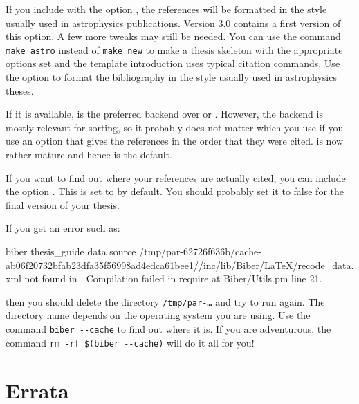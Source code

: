 If you include  with the option ,
the references will be formatted in the style usually used in astrophysics publications.
Version 3.0 contains a first version of this option.
A few more tweaks may still be needed. You can use the command
\verb|make astro| instead of \verb|make new| to make a thesis skeleton with the appropriate
options set and the template introduction uses typical citation commands.
Use the option  to format the bibliography in the style usually used in astrophysics theses.

If it is available,  is the preferred backend over
 or .
However, the backend is mostly relevant for
sorting, so it probably does not matter which you use if you use an
option that gives the references in the order that they were cited.
 is now rather mature and hence is the default.

If you want to find out where your references are actually cited, you
can include the option .
This is set to  by default.
You should probably set it to false for the final version of your thesis.

If you get an error such as:
{\scriptsize
\begin{bashlisting}
biber     thesis_guide
data source /tmp/par-62726f636b/cache-ab06f20732bfab23dfa35f56998ad4edca61bee1//inc/lib/Biber/LaTeX/recode_data.xml not found in .
Compilation failed in require at Biber/Utils.pm line 21.
\end{bashlisting}
}
\noindent
then you should delete the directory \texttt{/tmp/par-\ldots} and try to
run again. The directory name depends on the operating system you are using.
Use the command \verb|biber --cache| to find out where it is.
If you are adventurous, the command \verb|rm -rf $(biber --cache)| will do it all for you!


\section{Errata}%
\label{sec:ref:errata}

